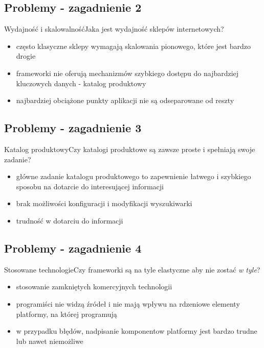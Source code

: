 \documentclass[polish,xcolor=table,9pt,aspectratio=1610,hyperref={pdfpagemode=FullScreen}]{beamer}
\begin{document}
\subsection{Problemy - zagadnienie 2}

\begin{frame}{Wydajność i skalowalność}{Jaka jest wydajność sklepów internetowych?}
	\begin{itemize}
		\item<1-> często klasyczne sklepy wymagają skalowania pionowego, które jest bardzo drogie
		\item<2-> frameworki nie oferują mechanizmów szybkiego dostępu do najbardziej kluczowych danych - katalog produktowy %
		\item<3-> najbardziej obciążone punkty aplikacji nie są odseparowane od reszty 
	\end{itemize}
\end{frame}

\subsection{Problemy - zagadnienie 3}

\begin{frame}{Katalog produktowy}{Czy katalogi produktowe są zawsze proste i spełniają swoje zadanie?}
	\begin{itemize}
		\item<1-> główne zadanie katalogu produktowego to zapewnienie łatwego i szybkiego sposobu na dotarcie do interesującej informacji
		\item<2-> brak możliwości konfiguracji i modyfikacji wyszukiwarki %
		\item<3-> trudność w dotarciu do informacji
	\end{itemize}
\end{frame}

\subsection{Problemy - zagadnienie 4}

\begin{frame}{Stosowane technologie}{Czy frameworki są na tyle elastyczne aby nie zostać \textit{w tyle}?}
	\begin{itemize}
		\item<1-> stosowanie zamkniętych komercyjnych technologii 
		\item<2-> programiści nie widzą źródeł i nie mają wpływu na rdzeniowe elementy platformy, na której programują 
		\item<3-> w przypadku błędów, nadpisanie komponentow platformy jest bardzo trudne lub nawet niemożliwe
	\end{itemize}
\end{frame}
\end{document}
